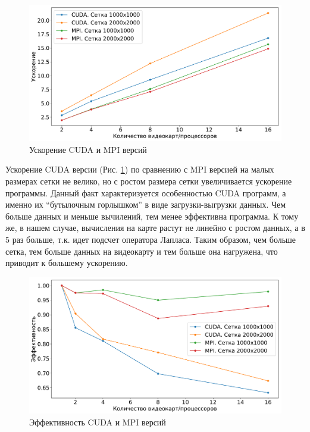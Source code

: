 \documentclass[12pt, a4paper]{article}
\begin{document}
            \begin{figure}[H]
                \centering
                \includegraphics[width=\textwidth]{pics/cuda_s.pdf}
                \caption{Ускорение CUDA и MPI версий}
                \label{fig:cuda_s}
            \end{figure}

            Ускорение CUDA версии (Рис. \ref{fig:cuda_s}) по сравнению с MPI версией на малых размерах сетки не велико, но с ростом размера сетки увеличивается ускорение программы. Данный факт характеризуется особенностью CUDA программ, а именно их ``бутылочным горлышком'' в виде загрузки-выгрузки данных. Чем больше данных и меньше вычилений, тем менее эффективна программа. К тому же, в нашем случае, вычисления на карте растут не линейно с ростом данных, а в 5 раз больше, т.к. идет подсчет оператора Лапласа. Таким образом, чем больше сетка, тем больше данных на видеокарту и тем больше она нагружена, что приводит к большему ускорению.

            \begin{figure}[H]
                \centering
                \includegraphics[width=\textwidth]{pics/cuda_e.pdf}
                \caption{Эффективность CUDA и MPI версий}
                \label{fig:cuda_e}
            \end{figure}
\end{document}
